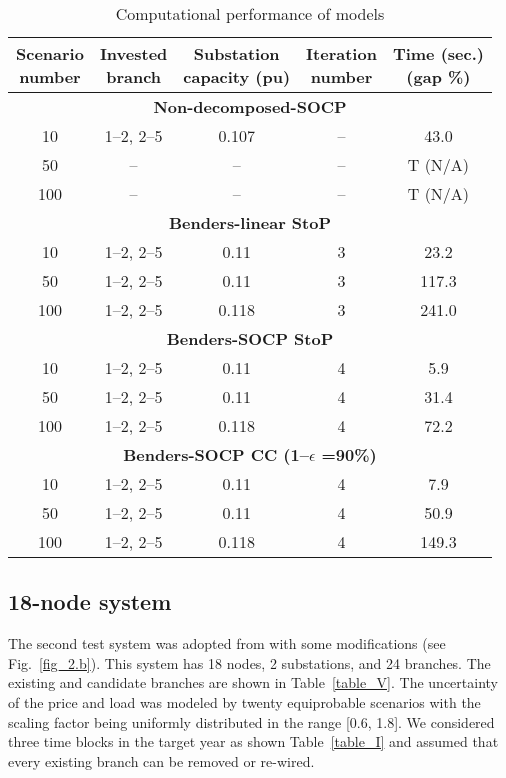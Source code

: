 \documentclass[journal]{IEEEtran}
\theoremstyle{remark}
\begin{document}
\begin{table}[htbp]
\renewcommand{\arraystretch}{1.1}
  \centering
  \caption{Computational performance of models}
  \label{table_IV}
    \begin{tabular}{ccccc}
    \toprule
    \pbox{20cm} {Scenario \\number} & \pbox{20cm} {Invested \\branch} & \pbox{20cm} {Substation\\ capacity (pu)} & \pbox{20cm} {Iteration \\number} & \pbox{20cm} {Time (sec.)\\ (gap \%)} \\
    \midrule
    \multicolumn{5}{c}{\textbf{Non-decomposed-SOCP}} \\
    10    & 1--2, 2--5 & 0.107 & --     & 43.0 \\
    50    & --     & --     & --     & T (N/A) \\
    100   & --     & --     & --     & T (N/A) \\
    \midrule
    \multicolumn{5}{c}{\textbf{Benders-linear StoP}} \\
    10    & 1--2, 2--5 & 0.11  & 3     & 23.2 \\
    50    & 1--2, 2--5 & 0.11  & 3     & 117.3 \\
    100   & 1--2, 2--5 & 0.118 & 3     & 241.0 \\
    \midrule
    \multicolumn{5}{c}{\textbf{Benders-SOCP StoP}} \\
    10    & 1--2, 2--5 & 0.11  & 4     & 5.9 \\
    50    & 1--2, 2--5 & 0.11  & 4     & 31.4 \\
    100   & 1--2, 2--5 & 0.118 & 4     & 72.2 \\
    \midrule
    \multicolumn{5}{c}{\textbf{Benders-SOCP CC (1--$\epsilon$ =90\%)}} \\
    10    & 1--2, 2--5 & 0.11  & 4     & 7.9 \\
    50    & 1--2, 2--5 & 0.11  & 4     & 50.9 \\
    100   & 1--2, 2--5 & 0.118 & 4     & 149.3 \\
    \bottomrule
    \end{tabular}%
  \label{tab:addlabel}\vspace{-10pt}%
\end{table}%

\vspace{-.5cm}
\subsection{18-node system}
The second test system was adopted from \citep{Haffner2} with some modifications (see Fig.~\ref{fig_2.b}). This system has 18 nodes, 2 substations, and 24 branches. The existing and candidate branches are shown in Table~\ref{table_V}. The uncertainty of the price and load was modeled by twenty equiprobable scenarios with the scaling factor being uniformly distributed in the range [0.6, 1.8]. We considered three time blocks in the target year as shown Table~\ref{table_I} and assumed that every existing branch can be removed or re-wired.\par
\end{document}
